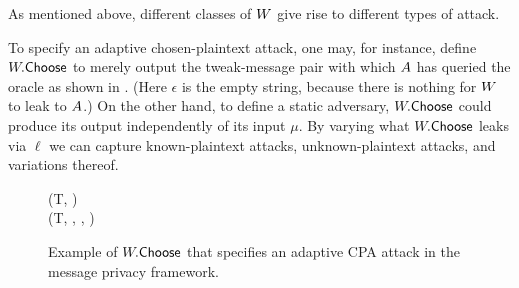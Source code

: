 As mentioned above, different classes of $W$ give rise to different types of attack.

To specify an adaptive chosen-plaintext attack, one may, for instance, define $W.\mathsf{Choose}$ to merely output the tweak-message pair with which $A$ has queried the oracle as shown in . (Here $\epsilon$ is the empty string, because there is nothing for $W$ to leak to $A$.) On the other hand, to define a static adversary, $W.\mathsf{Choose}$ could produce its output independently of its input $\mu$. By varying what $W.\mathsf{Choose}$ leaks via $\ell$ we can capture known-plaintext attacks, unknown-plaintext attacks, and variations thereof.

\begin{figure} [t]
\begin{center}
\fbox
{
\begin{pchstack}
\procedure{$\choice{\sampW}(\mu, \sigma)$}
  {
    (T, \msg) \gets \mu \\
    \pcreturn (T, \msg, \sigma, \epsilon)
  }
    \pchspace
\end{pchstack}
}
\end{center}
\vspace{-2ex}
\caption{ Example of $W.\mathsf{Choose}$ that specifies an adaptive CPA attack in the message privacy framework. }
\label{fig-fpe-ch}
\hrulefill
\end{figure}
